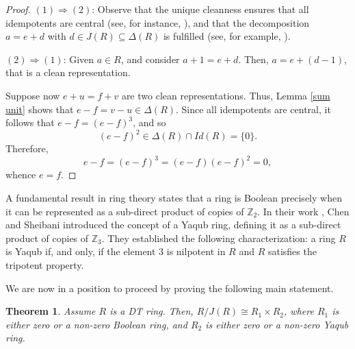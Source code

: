 \documentclass[12pt]{amsart}
\newtheorem{theorem}{Theorem}[section]
\theoremstyle{definition}
\begin{document}
\begin{proof}
\((1) \Rightarrow (2)\): Observe that the unique cleanness ensures that all idempotents are central (see, for instance, \cite[Lemma 4]{nzu}), and that the decomposition \(a = e + d\) with \(d \in J(R) \subseteq \Delta(R)\) is fulfilled (see, for example, \cite[Theorem 20]{nzu}).

\((2) \Rightarrow (1)\): Given \(a \in R\), and consider \(a+1 = e + d\). Then, \(a = e + (d-1)\), that is a clean representation.

Suppose now \(e + u = f + v\) are two clean representations. Thus, Lemma \ref{sum unit} shows that \(e - f = v - u \in \Delta(R)\). Since all idempotents are central, it follows that \(e - f = (e-f)^3\), and so \[(e-f)^2 \in \Delta(R) \cap Id(R) = \{0\}.\] Therefore, \[e - f = (e-f)^3 = (e-f)(e-f)^2 = 0,\] whence \(e = f\).
\end{proof}

A fundamental result in ring theory states that a ring is Boolean precisely when it can be represented as a sub-direct product of copies of $\mathbb{Z}_2$. In their work \cite{css}, Chen and Sheibani introduced the concept of a Yaqub ring, defining it as a sub-direct product of copies of $\mathbb{Z}_3$. They established the following characterization: a ring $R$ is Yaqub if, and only, if the element 3 is nilpotent in $R$ and $R$ satisfies the tripotent property.

\medskip

We are now in a position to proceed by proving the following main statement.

\begin{theorem}\label{boolean and yaqub}
Assume \(R\) is a DT ring. Then, \(R/J(R) \cong R_1 \times R_2\), where \(R_1\) is either zero or a non-zero Boolean ring, and \(R_2\) is either zero or a non-zero Yaqub ring.
\end{theorem}
\end{document}
